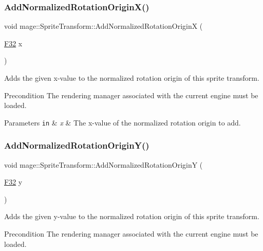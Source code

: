 \subsubsection{\texorpdfstring{Add\+Normalized\+Rotation\+Origin\+X()}{AddNormalizedRotationOriginX()}}
{\footnotesize\ttfamily void mage\+::\+Sprite\+Transform\+::\+Add\+Normalized\+Rotation\+OriginX (\begin{DoxyParamCaption}\item[{\hyperlink{namespacemage_aa97e833b45f06d60a0a9c4fc22ae02c0}{F32}}]{x }\end{DoxyParamCaption})}

Adds the given x-\/value to the normalized rotation origin of this sprite transform.

\begin{DoxyPrecond}{Precondition}
The rendering manager associated with the current engine must be loaded. 
\end{DoxyPrecond}

\begin{DoxyParams}[1]{Parameters}
\mbox{\tt in}  & {\em x} & The x-\/value of the normalized rotation origin to add. \\
\hline
\end{DoxyParams}
\hypertarget{structmage_1_1_sprite_transform_a322c799c3cc72ac44dbc1a2ed1234a67}{}\label{structmage_1_1_sprite_transform_a322c799c3cc72ac44dbc1a2ed1234a67} 
\subsubsection{\texorpdfstring{Add\+Normalized\+Rotation\+Origin\+Y()}{AddNormalizedRotationOriginY()}}
{\footnotesize\ttfamily void mage\+::\+Sprite\+Transform\+::\+Add\+Normalized\+Rotation\+OriginY (\begin{DoxyParamCaption}\item[{\hyperlink{namespacemage_aa97e833b45f06d60a0a9c4fc22ae02c0}{F32}}]{y }\end{DoxyParamCaption})}

Adds the given y-\/value to the normalized rotation origin of this sprite transform.

\begin{DoxyPrecond}{Precondition}
The rendering manager associated with the current engine must be loaded. 
\end{DoxyPrecond}

